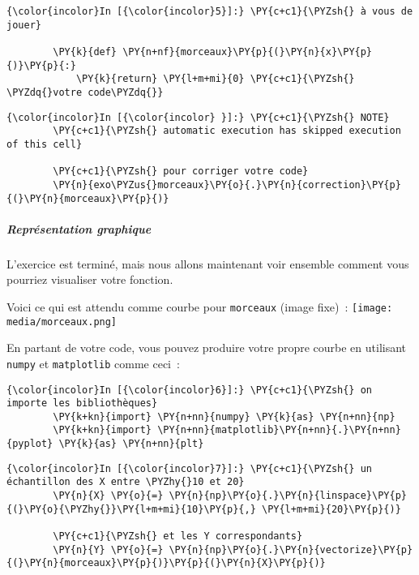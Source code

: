     \begin{Verbatim}[commandchars=\\\{\}]
{\color{incolor}In [{\color{incolor}5}]:} \PY{c+c1}{\PYZsh{} à vous de jouer}
        
        \PY{k}{def} \PY{n+nf}{morceaux}\PY{p}{(}\PY{n}{x}\PY{p}{)}\PY{p}{:}
            \PY{k}{return} \PY{l+m+mi}{0} \PY{c+c1}{\PYZsh{} \PYZdq{}votre code\PYZdq{}}
\end{Verbatim}


    \begin{Verbatim}[commandchars=\\\{\}]
{\color{incolor}In [{\color{incolor} }]:} \PY{c+c1}{\PYZsh{} NOTE}
        \PY{c+c1}{\PYZsh{} automatic execution has skipped execution of this cell}
        
        \PY{c+c1}{\PYZsh{} pour corriger votre code}
        \PY{n}{exo\PYZus{}morceaux}\PY{o}{.}\PY{n}{correction}\PY{p}{(}\PY{n}{morceaux}\PY{p}{)}
\end{Verbatim}


    \hypertarget{repruxe9sentation-graphique}{%
\subparagraph{Représentation
graphique}\label{repruxe9sentation-graphique}}

    L'exercice est terminé, mais nous allons maintenant voir ensemble
comment vous pourriez visualiser votre fonction.

Voici ce qui est attendu comme courbe pour \texttt{morceaux} (image
fixe)~: \texttt{[image: media/morceaux.png]}

    En partant de votre code, vous pouvez produire votre propre courbe en
utilisant \texttt{numpy} et \texttt{matplotlib} comme ceci~:

    \begin{Verbatim}[commandchars=\\\{\}]
{\color{incolor}In [{\color{incolor}6}]:} \PY{c+c1}{\PYZsh{} on importe les bibliothèques}
        \PY{k+kn}{import} \PY{n+nn}{numpy} \PY{k}{as} \PY{n+nn}{np}
        \PY{k+kn}{import} \PY{n+nn}{matplotlib}\PY{n+nn}{.}\PY{n+nn}{pyplot} \PY{k}{as} \PY{n+nn}{plt}
\end{Verbatim}


    \begin{Verbatim}[commandchars=\\\{\}]
{\color{incolor}In [{\color{incolor}7}]:} \PY{c+c1}{\PYZsh{} un échantillon des X entre \PYZhy{}10 et 20}
        \PY{n}{X} \PY{o}{=} \PY{n}{np}\PY{o}{.}\PY{n}{linspace}\PY{p}{(}\PY{o}{\PYZhy{}}\PY{l+m+mi}{10}\PY{p}{,} \PY{l+m+mi}{20}\PY{p}{)}
        
        \PY{c+c1}{\PYZsh{} et les Y correspondants}
        \PY{n}{Y} \PY{o}{=} \PY{n}{np}\PY{o}{.}\PY{n}{vectorize}\PY{p}{(}\PY{n}{morceaux}\PY{p}{)}\PY{p}{(}\PY{n}{X}\PY{p}{)}
\end{Verbatim}


